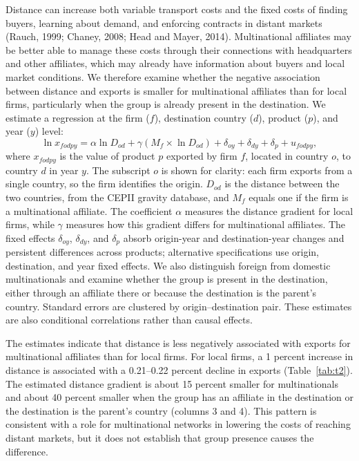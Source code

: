 \documentclass[11pt,a4paper]{article}
\begin{document}
Distance can increase both variable transport costs and the fixed costs of finding buyers,
learning about demand, and enforcing contracts in distant markets (Rauch, 1999; Chaney, 2008; Head
and Mayer, 2014). Multinational affiliates may be better able to manage these costs through their
connections with headquarters and other affiliates, which may already have information about buyers
and local market conditions. We therefore examine whether the negative association between distance
and exports is smaller for multinational affiliates than for local firms, particularly when the
group is already present in the destination. We estimate a regression at the firm ($f$), destination
country ($d$), product ($p$), and year ($y$) level:
\begin{equation}\label{eq:dist}
\ln x_{fodpy} = \alpha \ln D_{od} + \gamma \left(M_{f} \times \ln D_{od}\right) + \delta_{oy} + \delta_{dy} + \delta_{p} + u_{fodpy},
\end{equation}
where $x_{fodpy}$ is the value of product $p$ exported by firm $f$, located in country $o$, to
country $d$ in year $y$. The subscript $o$ is shown for clarity: each firm exports from a single
country, so the firm identifies the origin. $D_{od}$ is the distance between the two countries,
from the CEPII gravity database, and $M_f$ equals one if the firm is a multinational affiliate.
The coefficient $\alpha$ measures the distance gradient for local firms, while $\gamma$ measures
how this gradient differs for multinational affiliates. The fixed effects $\delta_{oy}$,
$\delta_{dy}$, and $\delta_p$ absorb origin-year and destination-year changes and persistent
differences across products; alternative specifications use origin, destination, and year fixed
effects. We also distinguish foreign from domestic multinationals and examine whether the group is
present in the destination, either through an affiliate there or because the destination is the
parent's country. Standard errors are clustered by origin--destination pair. These estimates are
also conditional correlations rather than causal effects.

The estimates indicate that distance is less negatively associated with exports for multinational
affiliates than for local firms. For local firms, a 1 percent increase in distance is associated
with a 0.21--0.22 percent decline in exports (Table~\ref{tab:t2}). The estimated distance gradient
is about 15 percent smaller for multinationals and about 40 percent smaller when the group has an
affiliate in the destination or the destination is the parent's country (columns 3 and 4). This
pattern is consistent with a role for multinational networks in lowering the costs of reaching
distant markets, but it does not establish that group presence causes the difference.
\end{document}
